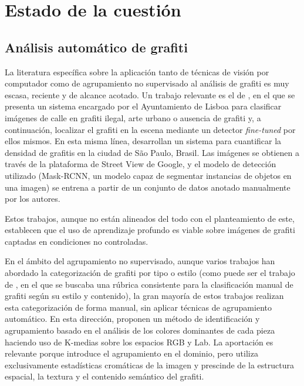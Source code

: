\section{Estado de la cuestión}
\label{sec:art}

\subsection{Análisis automático de grafiti}
\label{subsec:art-grafiti}

La literatura específica sobre la aplicación tanto de técnicas de visión por
computador como de agrupamiento no supervisado al análisis de grafiti es muy
escasa, reciente y de alcance acotado. Un trabajo relevante es el de
, en el que se presenta un sistema
encargado por el Ayuntamiento de Lisboa para clasificar imágenes de calle en
grafiti ilegal, arte urbano o ausencia de grafiti y, a continuación, localizar
el grafiti en la escena mediante un detector \textit{fine-tuned} por ellos
mismos. En esta misma línea, 
desarrollan un sistema para cuantificar la densidad de grafitis en la ciudad de
São Paulo, Brasil. Las imágenes se obtienen a través de la plataforma de Street
View de Google, y el modelo de detección utilizado (Mask-RCNN, un modelo capaz
de segmentar instancias de objetos en una imagen) se entrena a partir de un
conjunto de datos anotado manualmente por los autores.

Estos trabajos, aunque no están alineados del todo con el planteamiento de
este, establecen que el uso de aprendizaje profundo es viable sobre imágenes de
grafiti captadas en condiciones no controladas.

En el ámbito del agrupamiento no supervisado, aunque varios trabajos han
abordado la categorización de grafiti por tipo o estilo (como puede ser el
trabajo de , en el que se
buscaba una rúbrica consistente para la clasificación manual de grafiti según
su estilo y contenido), la gran mayoría de estos trabajos realizan esta
categorización de forma manual, sin aplicar técnicas de agrupamiento
automático. En esta dirección,
 proponen un método de
identificación y agrupamiento basado en el análisis de los colores dominantes
de cada pieza haciendo uso de K-medias sobre los espacios RGB y Lab. La
aportación es relevante porque introduce el agrupamiento en el dominio, pero
utiliza exclusivamente estadísticas cromáticas de la imagen y prescinde de la
estructura espacial, la textura y el contenido semántico del grafiti.

